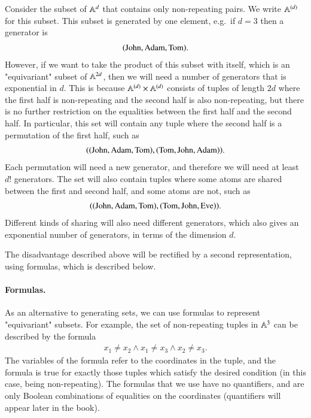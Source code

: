 \begin{myexample}\label{ex:pof-product-generating-set}
    Consider the subset of $\mathbb A^d$ that contains only non-repeating pairs. We write $\mathbb A^{(d)}$ for this subset. This subset is generated by one element, e.g.~if $d=3$ then a generator is
    \begin{align*}
    (\text{John}, \text{Adam}, \text{Tom}).
    \end{align*}
    However, if we want to take the product of this subset with itself, which is an "equivariant" subset of $\mathbb A^{2d}$,  then we will need a number of generators that is exponential in $d$. This is because $\mathbb A^{(d)} \times \mathbb A^{(d)}$   consists of tuples of length $2d$ where the first half is non-repeating and the second half is also non-repeating, but  there is no further restriction on the equalities between the first half and the second half.  In particular, this set will contain any tuple where the second half is a permutation of the first half, such as 
    \begin{align*}
    ((\text{John},\text{Adam},\text{Tom}),(\text{Tom},\text{John},\text{Adam})).
    \end{align*}
    Each permutation will need a new generator, and therefore we will need at least $d!$ generators. The set will also contain tuples where some atoms are shared between the first and second half, and some atoms are not, such as 
    \begin{align*}
    ((\text{John},\text{Adam},\text{Tom}),(\text{Tom},\text{John},\text{Eve})).
    \end{align*}
    Different kinds of sharing will also need different generators, which also gives an exponential number of generators, in terms of the dimension $d$.
\end{myexample}

The disadvantage described above will be rectified by a second representation, using formulas, which is described below.
\paragraph*{Formulas.}
 As an alternative to generating sets, we can use formulas to represent "equivariant" subsets. For example, the set of non-repeating tuples in $\mathbb A^3$ can be described by the formula 
\begin{align*}
x_1 \neq x_2 \land x_1 \neq x_3 \land x_2 \neq x_3.
\end{align*}
The variables of the formula refer to the coordinates in the tuple, and the formula is true for exactly those tuples which satisfy the desired condition (in this case, being non-repeating). 
The formulas that we use have no quantifiers, and are only Boolean combinations of equalities on the coordinates (quantifiers will appear later in the book).

